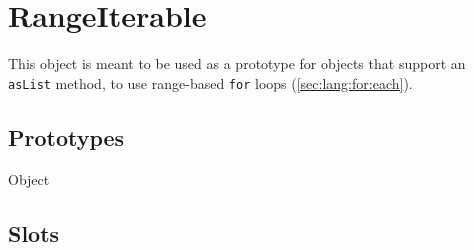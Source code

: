 
\section{RangeIterable}

This object is meant to be used as a prototype for objects that support an
\lstinline|asList| method, to use range-based \lstinline|for| loops
(\autoref{sec:lang:for:each}).

\subsection{Prototypes}

\begin{refObjects}
\item[Object]
\end{refObjects}

\subsection{Slots}

